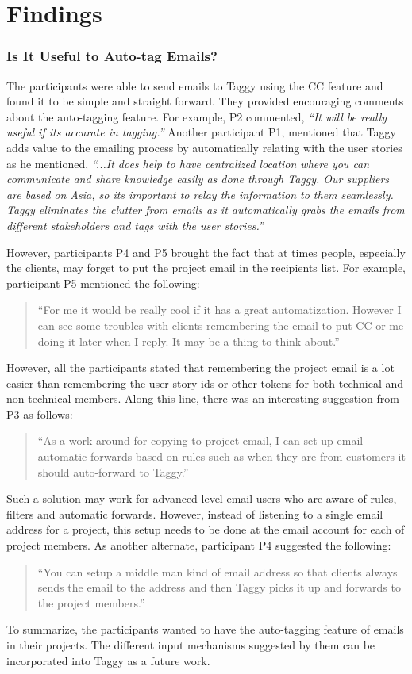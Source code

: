 \section{Findings}

\subsubsection{Is It Useful to Auto-tag Emails?}
The participants were able to send emails to Taggy using the CC feature and found it to be simple and straight forward. They provided encouraging comments about the auto-tagging feature. For example, P2 commented, \emph{``It will be really useful if its accurate in tagging.''} Another participant P1, mentioned that Taggy adds value to the emailing process by automatically relating with the user stories as he mentioned, \emph{``...It does help to have centralized location where you can communicate and share knowledge easily as done through Taggy. Our suppliers are based on Asia, so its important to relay the information to them seamlessly. Taggy eliminates the clutter from emails as it automatically grabs the emails from different stakeholders and tags with the user stories.''}

However, participants P4 and P5 brought the fact that at times people, especially the clients, may forget to put the project email in the recipients list. For example, participant P5 mentioned the following:
\begin{quote}
 ``For me it would be really cool if it has a great automatization. However I can see some troubles with clients remembering the email to put CC or me doing it later when I reply. It may be a thing to think about.''
\end{quote}
However, all the participants stated that remembering the project email is a lot easier than remembering the user story ids or other tokens for both technical and non-technical members. Along this line, there was an interesting suggestion from P3 as follows:
\begin{quote}
	``As a work-around for copying to project email, I can set up email automatic forwards based on rules such as when they are from customers it should auto-forward to Taggy.'' 
\end{quote}
Such a solution may work for advanced level email users who are aware of rules, filters and automatic forwards. However, instead of listening to a single email address for a project, this setup needs to be done at the email account for each of project members. As another alternate, participant P4 suggested the following:
\begin{quote}
	``You can setup a middle man kind of email address so that clients always sends the email to the address and then Taggy picks it up and forwards to the project members.''
\end{quote}
To summarize, the participants wanted to have the auto-tagging feature of emails in their projects. The different input mechanisms suggested by them can be incorporated into Taggy as a future work.

